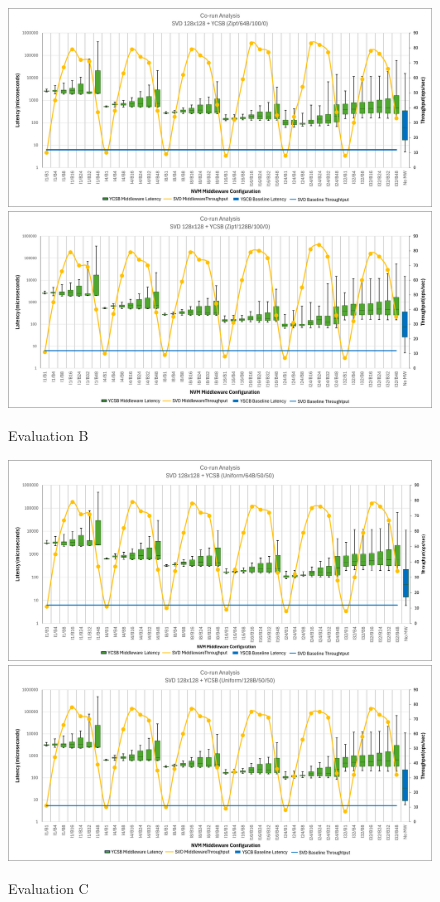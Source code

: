 \begin{figure}[ht]
  \centering
  \includegraphics[width=\textwidth,height=\textheight,keepaspectratio,angle=0]{images/64b_100_0_middleware_eval.png}
  \includegraphics[width=\textwidth,height=\textheight,keepaspectratio,angle=0]{images/128b_100_0_middleware_eval.png}
  \caption{Evaluation B}
  \label{fig:100_0_middleware_eval}
\end{figure}

\begin{figure}[ht]
  \centering
  \includegraphics[width=\textwidth,height=\textheight,keepaspectratio,angle=0]{images/64b_uniform_50_50_middleware_eval.png}
  \includegraphics[width=\textwidth,height=\textheight,keepaspectratio,angle=0]{images/128b_uniform_50_50_middleware_eval.png}
  \caption{Evaluation C}
  \label{fig:uniform_50_50_middleware_eval}
\end{figure}